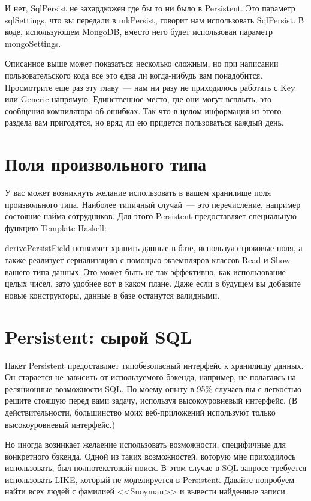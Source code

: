 И нет, SqlPersist не захардкожен где бы то ни было в Persistent. Это параметр sqlSettings, что вы передали в mkPersist, говорит нам использовать SqlPersist. В коде, использующем MongoDB, вместо него будет использован параметр mongoSettings.

Описанное выше может показаться несколько сложным, но при написании пользовательского кода все это едва ли когда-нибудь вам понадобится. Просмотрите еще раз эту главу~--- нам ни разу не приходилось работать с Key или Generic напрямую. Единственное место, где они могут всплыть, это сообщения компилятора об ошибках. Так что в целом информация из этого раздела вам пригодятся, но вряд ли ею придется пользоваться каждый день.

\section{Поля произвольного типа} %

У вас может возникнуть желание использовать в вашем хранилище поля произвольного типа. Наиболее типичный случай~--- это перечисление, например состояние найма сотрудников. Для этого Persistent предоставляет специальную функцию Template Haskell:


derivePersistField позволяет хранить данные в базе, используя строковые поля, а также реализует сериализацию с помощью экземпляров классов Read и Show вашего типа данных. Это может быть не так эффективно, как использование целых чисел, зато удобнее вот в каком плане. Даже если в будущем вы добавите новые конструкторы, данные в базе останутся валидными.

\section{Persistent: сырой SQL} %

Пакет Persistent предоставляет типобезопасный интерфейс к хранилищу данных. Он старается не зависить от используемого бэкенда, например, не полагаясь на реляционные возможности SQL. По моему опыту в 95\% случаев вы с легкостью решите стоящую перед вами задачу, используя высокоуровневый интерфейс. (В действительности, большинство моих веб-приложений используют только высокоуровневый интерфейс.)

Но иногда возникает желаение использовать возможности, специфичные для конкретного бэкенда. Одной из таких возможностей, которую мне приходилось использовать, был полнотекстовый поиск. В этом случае в SQL-запросе требуется использовать LIKE, который не моделируется в Persistent. Давайте попробуем найти всех людей с фамилией <<Snoyman>> и вывести найденные записи.

